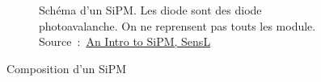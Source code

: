 \begin{figure}
\begin{subfigure}{0.45\textwidth}
        \captionsetup{width=.85\textwidth}
        \caption{Schéma d'un SiPM. Les diode sont des diode photoavalanche. On ne reprensent pas touts les module. Source~:~\href{https://websites.umich.edu/~ners580/ners-bioe_481/lectures/pdfs/2017-02-.pdf}{An Intro to SiPM, SensL}}
        \label{fig_SiPM}
    \end{subfigure}
    \caption[Composition d'un SiPM]{Composition d'un SiPM}
\end{figure}
